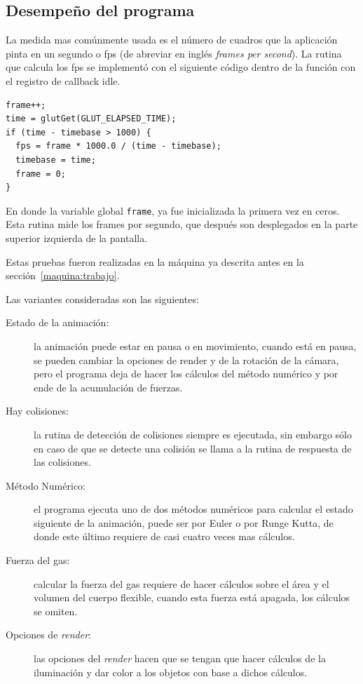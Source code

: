 \subsection{Desempeño del programa}

La medida mas comúnmente usada es el número de cuadros que la aplicación pinta en un segundo o fps (de abreviar en inglés \emph{\foreignlanguage{english}{frames per second}}).
La rutina que calcula los fps se implementó con el siguiente código dentro de la función con el registro de callback idle.

\begin{verbatim}
frame++;
time = glutGet(GLUT_ELAPSED_TIME);
if (time - timebase > 1000) {
  fps = frame * 1000.0 / (time - timebase);
  timebase = time;
  frame = 0;
}\end{verbatim}

En donde la variable global \verb|frame|, ya fue inicializada la primera vez en ceros.
Esta rutina mide los frames por segundo, que después son desplegados en la parte superior izquierda de la pantalla.

Estas pruebas fueron realizadas en la máquina ya descrita antes en la sección~\ref{maquina:trabajo}.

Las variantes consideradas son las siguientes:

\begin{description}
 \item[Estado de la animación:]la animación puede estar en pausa o en movimiento, cuando está en pausa, se pueden cambiar la opciones de render y de la rotación de la cámara, pero el programa deja de hacer los cálculos del método numérico y por ende de la acumulación de fuerzas.
 \item[Hay colisiones:]la rutina de detección de colisiones siempre es ejecutada, sin embargo sólo en caso de que se detecte una colisión se llama a la rutina de respuesta de las colisiones.
 \item[Método Numérico:]el programa ejecuta uno de dos métodos numéricos para calcular el estado siguiente de la animación, puede ser por Euler o por Runge Kutta, de donde este último requiere de casi cuatro veces mas cálculos.
 \item[Fuerza del gas:]calcular la fuerza del gas requiere de hacer cálculos sobre el área y el volumen del cuerpo flexible, cuando esta fuerza está apagada, los cálculos se omiten.
 \item[Opciones de \emph{\foreignlanguage{english}{render}}:]las opciones del \emph{\foreignlanguage{english}{render}} hacen que se tengan que hacer cálculos de la iluminación y dar color a los objetos con base a dichos cálculos.
\end{description}

